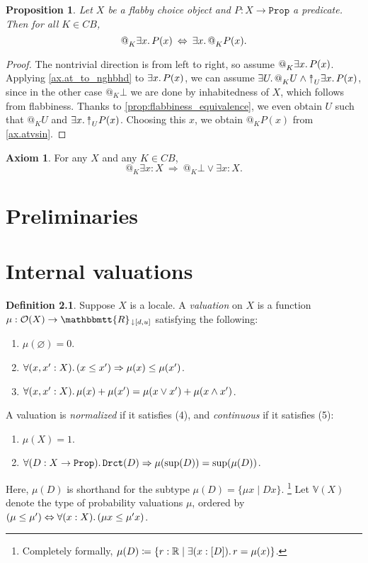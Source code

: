 \documentclass[11pt, oneside, article]{memoir}
\makeatletter
\theoremstyle{plain}
\newtheorem{proposition}[theorem]{Proposition}
\theoremstyle{definition}
\newtheorem{definition}[theorem]{Definition}
\newtheorem{axiom}{Axiom}
\theoremstyle{remark}
\DeclarePairedDelimiter{\subtype}{[}{]}
\newcommand{\const}[1]{\mathtt{#1}}
\newcommand{\internal}[1]{\raisebox{-.03ex}{$\mathbbmtt{#1}$}}
\newcommand{\hs}{\hspace{1.1pt}}
\newcommand{\RR}{\mathbb{R}}
\newcommand{\VV}{\mathbb{V}}
\newcommand{\tRR}{\internal{R}\hs}
\newcommand{\tRRat}[1]{\tRR_{\SeeInline{#1}}}
\newcommand{\Prop}{\const{Prop}}
\newcommand{\BaseSpace}{B}
\newcommand{\AtSymbol}{{@}}
\newcommand{\SeeSymbol}{{\down}}  %
\newcommand{\InSymbol}{{\upclose}}%
\newcommand{\At}[2][]{\AtSymbol^{#1}_{#2}}
\newcommand{\In}[2][]{\InSymbol^{#1}_{#2}}
\newcommand{\SeeInline}[1]{\SeeSymbol{#1}}
\newcommand{\upclose}{{\rotatebox[origin=c]{90}{$\twoheadrightarrow$}}}
\newcommand{\down}{\mathord{\downarrow}}
\newcommand{\imp}{\Rightarrow}
\renewcommand{\iff}{\Leftrightarrow}
\makeatother
\begin{document}
\begin{proposition}
Let $X$ be a flabby choice object and $P : X \to \Prop$ a predicate. Then for all $K \in C\BaseSpace$,
\[
	\At{K} \exists x\ldotp P(x) \: \Leftrightarrow \: \exists x\ldotp \At{K} P(x).
\]
\end{proposition}

\begin{proof}
The nontrivial direction is from left to right, so assume $\At{K} \exists x\ldotp P(x)$. Applying \cref{ax.at_to_nghbhd} to $\exists x\ldotp P(x)$, we can assume $\exists U\ldotp \At{K} U \wedge \In{U} \exists x\ldotp P(x)$, since in the other case $\At{K}\bot$ we are done by inhabitedness of $X$, which follows from flabbiness. Thanks to \cref{prop:flabbiness_equivalence}, we even obtain $U$ such that $\At{K} U$ and $\exists x\ldotp \In{U} P(x)$. Choosing this $x$, we obtain $\At{K} P(x)$ from \cref{ax.atvsin}.
\end{proof}

\begin{axiom}
For any $X$ and any $K\in C\BaseSpace$,
\[
	\At{K} \exists x : X \: \Rightarrow \: \At{K} \bot \vee \exists x : X.
\]
\end{axiom}

\chapter{Preliminaries}

\chapter{Internal valuations}



\begin{definition}\label{def.valuation}
Suppose $X$ is a locale. A \emph{valuation} on $X$ is a function $\mu:\mathcal{O}(X)\to\tRRat{[d,u]}$ satisfying the following:
\begin{enumerate}
	\item $\mu(\varnothing)=0$.
	\item $\forall(x,x':X)\ldotp(x\leq x')\imp\mu(x)\leq\mu(x')$.
	\item $\forall(x,x':X)\ldotp\mu(x)+\mu(x')=\mu(x\vee x')+\mu(x\wedge x')$.
\end{enumerate}
A valuation is \emph{normalized} if it satisfies (4), and \emph{continuous} if it satisfies (5):
\begin{enumerate}[resume]
	\item $\mu(X) = 1$.
	\item $\forall(D:X\to\Prop)\ldotp\const{Drct}(D)\imp \mu(\sup(D))=\sup(\mu(D))$.
\end{enumerate}
Here, $\mu(D)$ is shorthand for the subtype $\mu(D)=\{\mu x\mid Dx\}$.%
\footnote{Completely formally, $\mu(D)\coloneqq\{r:\RR\mid\exists(x:\subtype{D})\ldotp r=\mu(x)\}$.}
Let $\VV(X)$ denote the type of probability valuations $\mu$, ordered by $(\mu\leq\mu')\iff\forall(x:X)\ldotp(\mu x\leq \mu'x)$.
\end{definition}
\end{document}
